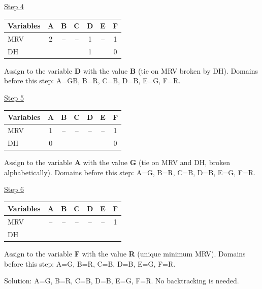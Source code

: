 \documentclass[11pt,a4paper]{article}
\begin{document}
\begin{solbox}
\underline{Step 4}\par\begin{center}\small \begin{tabular}{|l|c|c|c|c|c|c|}\hline Variables & \textbf{A} & \textbf{B} & \textbf{C} & \textbf{D} & \textbf{E} & \textbf{F}\\ \hline MRV & \textcolor{blue!60!black}{2} & -- & -- & \textcolor{blue!60!black}{1} & -- & \textcolor{blue!60!black}{1}\\ \hline DH &  &  &  & \textcolor{blue!60!black}{1} &  & \textcolor{blue!60!black}{0}\\ \hline\end{tabular}\end{center}Assign to the variable \textbf{D} with the value \textbf{B} (tie on MRV broken by DH). Domains before this step: A=GB, B=R, C=B, D=B, E=G, F=R.\par
\underline{Step 5}\par\begin{center}\small \begin{tabular}{|l|c|c|c|c|c|c|}\hline Variables & \textbf{A} & \textbf{B} & \textbf{C} & \textbf{D} & \textbf{E} & \textbf{F}\\ \hline MRV & \textcolor{blue!60!black}{1} & -- & -- & -- & -- & \textcolor{blue!60!black}{1}\\ \hline DH & \textcolor{blue!60!black}{0} &  &  &  &  & \textcolor{blue!60!black}{0}\\ \hline\end{tabular}\end{center}Assign to the variable \textbf{A} with the value \textbf{G} (tie on MRV and DH, broken alphabetically). Domains before this step: A=G, B=R, C=B, D=B, E=G, F=R.\par
\underline{Step 6}\par\begin{center}\small \begin{tabular}{|l|c|c|c|c|c|c|}\hline Variables & \textbf{A} & \textbf{B} & \textbf{C} & \textbf{D} & \textbf{E} & \textbf{F}\\ \hline MRV & -- & -- & -- & -- & -- & \textcolor{blue!60!black}{1}\\ \hline DH &  &  &  &  &  & \\ \hline\end{tabular}\end{center}Assign to the variable \textbf{F} with the value \textbf{R} (unique minimum MRV). Domains before this step: A=G, B=R, C=B, D=B, E=G, F=R.\par Solution: A=G, B=R, C=B, D=B, E=G, F=R. No backtracking is needed.
\end{solbox}
\end{document}
